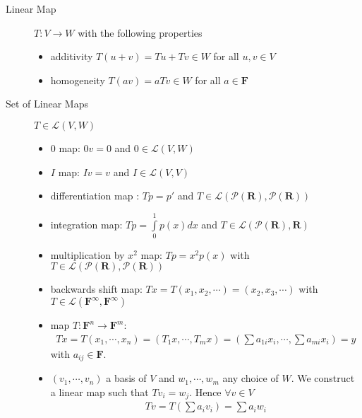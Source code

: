 \documentclass[11pt,notitlepage,oneside]{article}
\begin{document}
\begin{description}
  \item[Linear Map] $T:V\to W$ with the following properties
  \begin{itemize}
  \item additivity $T(u+v) = Tu +Tv \in W$ for all $u,v\in V$
  \item homogeneity $T(av) = aTv \in W$ for all $a\in \mathbf{F}$
  \end{itemize}
  \item[Set of Linear Maps\label{itm:D3_set_linear_maps}] $T\in \mathcal{L}(V,W)$
  \begin{itemize}
  \item $0$ map: $0v = 0$ and $0\in \mathcal{L}(V,W)$
  \item $I$ map: $Iv=v$ and $I\in \mathcal{L}(V,V)$
  \item differentiation map : $Tp = p'$ and $T\in \mathcal{L}(\mathcal{P}(\mathbf{R}),\mathcal{P}(\mathbf{R}))$
  \item integration map: $Tp = \int\limits_0^1p(x)dx$ and $T\in \mathcal{L}(\mathcal{P}(\mathbf{R}),\mathbf{R})$
  \item multiplication by $x^2$ map: $Tp=x^2p(x)$ with $T\in \mathcal{L}(\mathcal{P}(\mathbf{R}),\mathcal{P}(\mathbf{R}))$
  \item backwards shift map: $T x = T(x_1,x_2, \cdots) = (x_2, x_3, \cdots)$ with $T\in \mathcal{L}(\mathbf{F}^\infty, \mathbf{F}^\infty)$
  \item map $T:\mathbf{F}^n \to \mathbf{F}^m$: 
  \begin{align*}
  T x = T(x_1,\cdots,x_n) =  (T_1x,  \cdots, T_m x) = (\sum a_{1i}x_i,  \cdots, \sum a_{mi}x_i) = y
  \end{align*} with $a_{ij}\in\mathbf{F}$.
  
  \item $(v_1,\cdots,v_n)$ a basis of $V$ and $w_1,\cdots,w_m$ any choice of $W$. We construct a linear map such that $Tv_i=w_j$. Hence $\forall v\in V$
  \begin{align*}
  Tv = T(\sum a_i v_i) = \sum a_i w_i
  \end{align*}
  \end{itemize}
  

\end{description}
\end{document}
